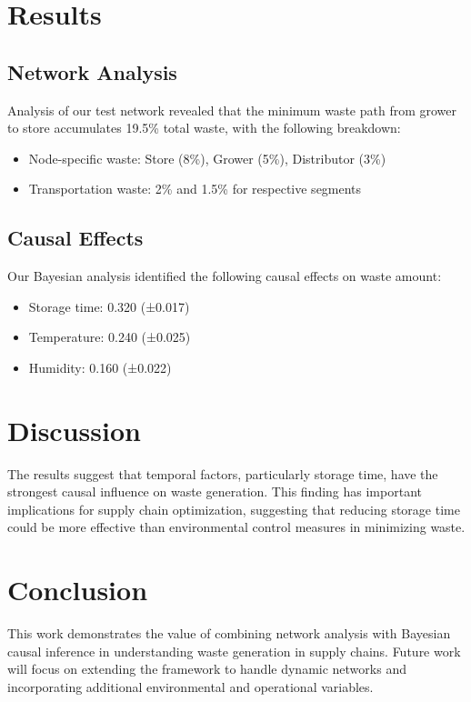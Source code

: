 \documentclass[12pt]{article}
\begin{document}
\section{Results}
\subsection{Network Analysis}
Analysis of our test network revealed that the minimum waste path from grower to store accumulates 19.5\% total waste, with the following breakdown:
\begin{itemize}
    \item Node-specific waste: Store (8\%), Grower (5\%), Distributor (3\%)
    \item Transportation waste: 2\% and 1.5\% for respective segments
\end{itemize}

\subsection{Causal Effects}
Our Bayesian analysis identified the following causal effects on waste amount:
\begin{itemize}
    \item Storage time: 0.320 (±0.017)
    \item Temperature: 0.240 (±0.025)
    \item Humidity: 0.160 (±0.022)
\end{itemize}

\section{Discussion}
The results suggest that temporal factors, particularly storage time, have the strongest causal influence on waste generation. This finding has important implications for supply chain optimization, suggesting that reducing storage time could be more effective than environmental control measures in minimizing waste.

\section{Conclusion}
This work demonstrates the value of combining network analysis with Bayesian causal inference in understanding waste generation in supply chains. Future work will focus on extending the framework to handle dynamic networks and incorporating additional environmental and operational variables.



\end{document}

